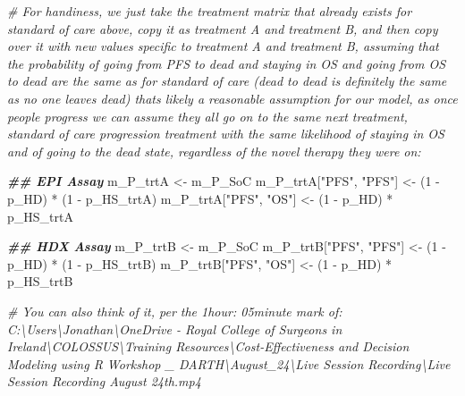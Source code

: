\documentclass[
]{article}
\newenvironment{Shaded}{\begin{snugshade}}{\end{snugshade}}
\newcommand{\CommentTok}[1]{\textcolor[rgb]{0.56,0.35,0.01}{\textit{#1}}}
\newcommand{\DecValTok}[1]{\textcolor[rgb]{0.00,0.00,0.81}{#1}}
\newcommand{\DocumentationTok}[1]{\textcolor[rgb]{0.56,0.35,0.01}{\textbf{\textit{#1}}}}
\newcommand{\NormalTok}[1]{#1}
\newcommand{\OtherTok}[1]{\textcolor[rgb]{0.56,0.35,0.01}{#1}}
\newcommand{\SpecialCharTok}[1]{\textcolor[rgb]{0.00,0.00,0.00}{#1}}
\newcommand{\StringTok}[1]{\textcolor[rgb]{0.31,0.60,0.02}{#1}}
\begin{document}
\begin{Shaded}
\begin{Highlighting}[]
\CommentTok{\# For handiness, we just take the treatment matrix that already exists for standard of care above, copy it as treatment A and treatment B, and then copy over it with new values specific to treatment A and treatment B, assuming that the probability of going from PFS to dead and staying in OS and going from OS to dead are the same as for standard of care (dead to dead is definitely the same as no one leaves dead) that\textquotesingle{}s likely a reasonable assumption for our model, as once people progress we can assume they all go on to the same next treatment, standard of care progression treatment with the same likelihood of staying in OS and of going to the dead state, regardless of the novel therapy they were on:}

\DocumentationTok{\#\# EPI Assay}
\NormalTok{m\_P\_trtA }\OtherTok{\textless{}{-}}\NormalTok{ m\_P\_SoC}
\NormalTok{m\_P\_trtA[}\StringTok{"PFS"}\NormalTok{, }\StringTok{"PFS"}\NormalTok{] }\OtherTok{\textless{}{-}}\NormalTok{ (}\DecValTok{1} \SpecialCharTok{{-}}\NormalTok{ p\_HD) }\SpecialCharTok{*}\NormalTok{ (}\DecValTok{1} \SpecialCharTok{{-}}\NormalTok{ p\_HS\_trtA)}
\NormalTok{m\_P\_trtA[}\StringTok{"PFS"}\NormalTok{, }\StringTok{"OS"}\NormalTok{]    }\OtherTok{\textless{}{-}}\NormalTok{ (}\DecValTok{1} \SpecialCharTok{{-}}\NormalTok{ p\_HD) }\SpecialCharTok{*}\NormalTok{      p\_HS\_trtA}

\DocumentationTok{\#\# HDX Assay}
\NormalTok{m\_P\_trtB }\OtherTok{\textless{}{-}}\NormalTok{ m\_P\_SoC}
\NormalTok{m\_P\_trtB[}\StringTok{"PFS"}\NormalTok{, }\StringTok{"PFS"}\NormalTok{] }\OtherTok{\textless{}{-}}\NormalTok{ (}\DecValTok{1} \SpecialCharTok{{-}}\NormalTok{ p\_HD) }\SpecialCharTok{*}\NormalTok{ (}\DecValTok{1} \SpecialCharTok{{-}}\NormalTok{ p\_HS\_trtB)}
\NormalTok{m\_P\_trtB[}\StringTok{"PFS"}\NormalTok{, }\StringTok{"OS"}\NormalTok{]    }\OtherTok{\textless{}{-}}\NormalTok{ (}\DecValTok{1} \SpecialCharTok{{-}}\NormalTok{ p\_HD) }\SpecialCharTok{*}\NormalTok{      p\_HS\_trtB}



\CommentTok{\# You can also think of it, per the 1hour: 05minute mark of: C:\textbackslash{}Users\textbackslash{}Jonathan\textbackslash{}OneDrive {-} Royal College of Surgeons in Ireland\textbackslash{}COLOSSUS\textbackslash{}Training Resources\textbackslash{}Cost{-}Effectiveness and Decision Modeling using R Workshop \_ DARTH\textbackslash{}August\_24\textbackslash{}Live Session Recording\textbackslash{}Live Session Recording August 24th.mp4}



\end{Highlighting}
\end{Shaded}
\end{document}
